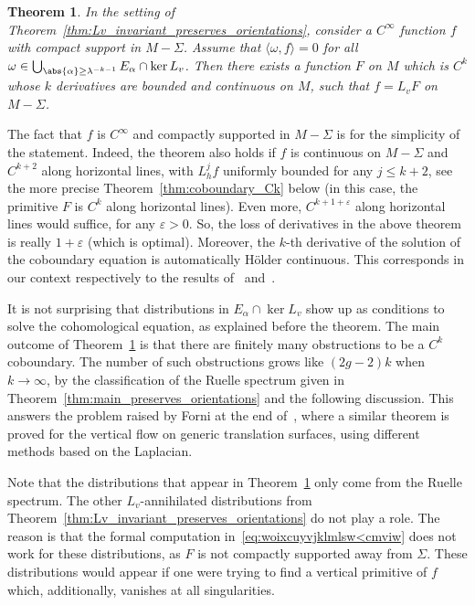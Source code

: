 \documentclass[10pt]{amsart}
\let\epsilon\varepsilon
\newtheorem{thm}{Theorem}[section]
\theoremstyle{definition}
\numberwithin{equation}{section}
\begin{document}
\begin{thm}
\label{thm:coboundary_Ck_main} In the setting of
Theorem~\ref{thm:Lv_invariant_preserves_orientations}, consider a $C^\infty$
function $f$ with compact support in $M-\Sigma$. Assume that $\langle \omega,
f\rangle = 0$ for all $\omega \in \bigcup_{\abs{\alpha} \geq \lambda^{-k-1}}
E_\alpha \cap \ker L_v$. Then there exists a function $F$ on $M$ which is
$C^k$ whose $k$ derivatives are bounded and continuous on $M$, such that $f =
L_v F$ on $M-\Sigma$.
\end{thm}
The fact that $f$ is $C^\infty$ and compactly supported in $M-\Sigma$ is for
the simplicity of the statement. Indeed, the theorem also holds if $f$ is
continuous on $M-\Sigma$ and $C^{k+2}$ along horizontal lines, with $L_h^j f$
uniformly bounded for any $j \leq k+2$, see the more precise
Theorem~\ref{thm:coboundary_Ck} below (in this case, the primitive $F$ is
$C^k$ along horizontal lines). Even more, $C^{k+1+\epsilon}$ along horizontal
lines would suffice, for any $\epsilon>0$. So, the loss of derivatives in the
above theorem is really $1+\epsilon$ (which is optimal). Moreover, the $k$-th
derivative of the solution of the coboundary equation is automatically Hölder
continuous. This corresponds in our context respectively to the results
of~\cite{forni_regularity} and~\cite{marmi_yoccoz_Holder}.

It is not surprising that distributions in $E_\alpha \cap \ker L_v$ show up
as conditions to solve the cohomological equation, as explained before the
theorem. The main outcome of Theorem~\ref{thm:coboundary_Ck_main} is that
there are finitely many obstructions to be a $C^k$ coboundary. The number of
such obstructions grows like $(2g-2)k$ when $k\to \infty$, by the
classification of the Ruelle spectrum given in
Theorem~\ref{thm:main_preserves_orientations} and the following discussion.
This answers the problem raised by Forni at the end
of~\cite{forni_cohomological}, where a similar theorem is proved for the
vertical flow on generic translation surfaces, using different methods based
on the Laplacian.

Note that the distributions that appear in
Theorem~\ref{thm:coboundary_Ck_main} only come from the Ruelle spectrum. The
other $L_v$-annihilated distributions from
Theorem~\ref{thm:Lv_invariant_preserves_orientations} do not play a role. The
reason is that the formal computation in~\eqref{eq:woixcuyvjklmlsw<cmviw}
does not work for these distributions, as $F$ is not compactly supported away
from $\Sigma$. These distributions would appear if one were trying to find a
vertical primitive of $f$ which, additionally, vanishes at all singularities.
\end{document}
